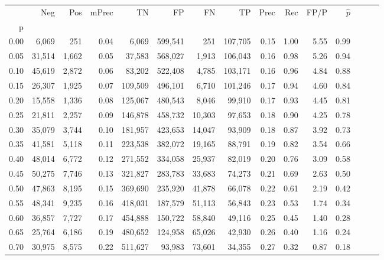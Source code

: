 \begin{tabular}{rrrrrrrrrrrrrrr}
\toprule
{} &     Neg &     Pos & mPrec &       TN &       FP &       FN &       TP &  Prec &   Rec &  FP/P & $\hat{p}$ \\
p    &         &         &       &          &          &          &          &       &       &       &           \\
\midrule
0.00 &   6,069 &     251 &  0.04 &    6,069 &  599,541 &      251 &  107,705 &  0.15 &  1.00 &  5.55 &      0.99 \\
0.05 &  31,514 &   1,662 &  0.05 &   37,583 &  568,027 &    1,913 &  106,043 &  0.16 &  0.98 &  5.26 &      0.94 \\
0.10 &  45,619 &   2,872 &  0.06 &   83,202 &  522,408 &    4,785 &  103,171 &  0.16 &  0.96 &  4.84 &      0.88 \\
0.15 &  26,307 &   1,925 &  0.07 &  109,509 &  496,101 &    6,710 &  101,246 &  0.17 &  0.94 &  4.60 &      0.84 \\
0.20 &  15,558 &   1,336 &  0.08 &  125,067 &  480,543 &    8,046 &   99,910 &  0.17 &  0.93 &  4.45 &      0.81 \\
0.25 &  21,811 &   2,257 &  0.09 &  146,878 &  458,732 &   10,303 &   97,653 &  0.18 &  0.90 &  4.25 &      0.78 \\
0.30 &  35,079 &   3,744 &  0.10 &  181,957 &  423,653 &   14,047 &   93,909 &  0.18 &  0.87 &  3.92 &      0.73 \\
0.35 &  41,581 &   5,118 &  0.11 &  223,538 &  382,072 &   19,165 &   88,791 &  0.19 &  0.82 &  3.54 &      0.66 \\
0.40 &  48,014 &   6,772 &  0.12 &  271,552 &  334,058 &   25,937 &   82,019 &  0.20 &  0.76 &  3.09 &      0.58 \\
0.45 &  50,275 &   7,746 &  0.13 &  321,827 &  283,783 &   33,683 &   74,273 &  0.21 &  0.69 &  2.63 &      0.50 \\
0.50 &  47,863 &   8,195 &  0.15 &  369,690 &  235,920 &   41,878 &   66,078 &  0.22 &  0.61 &  2.19 &      0.42 \\
0.55 &  48,341 &   9,235 &  0.16 &  418,031 &  187,579 &   51,113 &   56,843 &  0.23 &  0.53 &  1.74 &      0.34 \\
0.60 &  36,857 &   7,727 &  0.17 &  454,888 &  150,722 &   58,840 &   49,116 &  0.25 &  0.45 &  1.40 &      0.28 \\
0.65 &  25,764 &   6,186 &  0.19 &  480,652 &  124,958 &   65,026 &   42,930 &  0.26 &  0.40 &  1.16 &      0.24 \\
0.70 &  30,975 &   8,575 &  0.22 &  511,627 &   93,983 &   73,601 &   34,355 &  0.27 &  0.32 &  0.87 &      0.18 \\

\end{tabular}
